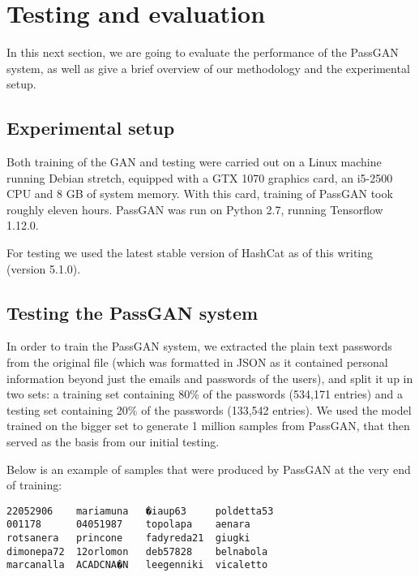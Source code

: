 \section{Testing and evaluation}
In this next section, we are going to evaluate the performance of the PassGAN system, as well as give a brief overview of our methodology and the experimental setup.

\subsection{Experimental setup}
Both training of the GAN and testing were carried out on a Linux machine running Debian stretch, equipped with a GTX 1070 graphics card, an i5-2500 CPU and 8 GB of system memory. 
With this card, training of PassGAN took roughly eleven hours.
PassGAN was run on Python 2.7, running Tensorflow 1.12.0.%

For testing we used the latest stable version of HashCat as of this writing (version 5.1.0). %

\subsection{Testing the PassGAN system}
In order to train the PassGAN system, we extracted the plain text passwords from the original file (which was formatted in JSON as it contained personal information beyond just the emails and passwords of the users), and split it up in two sets: a training set containing 80\% of the passwords (534,171 entries) and a testing set containing 20\% of the passwords (133,542 entries).
We used the model trained on the bigger set to generate 1 million samples from PassGAN, that then served as the basis from our initial testing.

Below is an example of samples that were produced by PassGAN at the very end of training: %
\begin{verbatim}
22052906    mariamuna   �iaup63     poldetta53
001178      04051987    topolapa    aenara
rotsanera   princone    fadyreda21  giugki
dimonepa72  12orlomon   deb57828    belnabola
marcanalla  ACADCNA�N   leegenniki  vicaletto
\end{verbatim}

